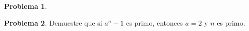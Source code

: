 \documentclass{article}
\newcommand{\ZZ}{\mathbb{Z}}
\theoremstyle{definition}
\newtheorem{problema}{Problema}
\newenvironment{solucion}{\begin{proof}[Solución]\small}{\end{proof}}
\begin{document}
\begin{problema}
 \end{problema}

 \begin{problema}
   Demuestre que si $a^n - 1$ es primo, entonces $a = 2$ y $n$ es primo.

\end{problema}
\end{document}
